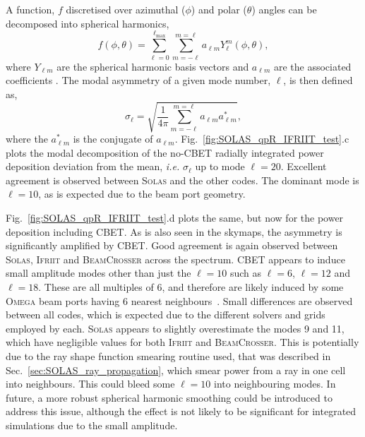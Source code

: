 A function, $f$ discretised over azimuthal ($\phi$) and polar ($\theta$) angles can be decomposed into spherical harmonics,
\begin{equation}
    f(\phi,\theta) = \sum_{\ell=0}^{\ell_{\text{max}}} \sum_{m=-\ell}^{m=\ell} a_{\ell m} Y_{\ell}^{m}(\phi,\theta),
\end{equation}
where $Y_{\ell m}$ are the spherical harmonic basis vectors and $a_{\ell m}$ are the associated coefficients \cite{colaitis_3d_2023}.
The modal asymmetry of a given mode number, $\ell$, is then defined as,
\begin{equation}
    \sigma_{\ell} = \sqrt{ \frac{1}{4\pi} \sum_{m=-\ell}^{m=\ell} a_{\ell m} a^*_{\ell m} },
\end{equation}
where the $a^*_{\ell m}$ is the conjugate of $a_{\ell m}$.
Fig.~\ref{fig:SOLAS_qpR_IFRIIT_test}.c plots the modal decomposition of the no-\ac{CBET} radially integrated power deposition deviation from the mean, \textit{i.e.} $\sigma_{\ell}$ up to mode $\ell=20$.
Excellent agreement is observed between \textsc{Solas} and the other codes.
The dominant mode is $\ell=10$, as is expected due to the beam port geometry.

Fig.~\ref{fig:SOLAS_qpR_IFRIIT_test}.d plots the same, but now for the power deposition including \ac{CBET}.
As is also seen in the skymaps, the asymmetry is significantly amplified by \ac{CBET}.
Good agreement is again observed between \textsc{Solas}, \textsc{Ifriit} and \textsc{BeamCrosser} across the spectrum.
\ac{CBET} appears to induce small amplitude modes other than just the $\ell=10$ such as $\ell=6$, $\ell=12$ and $\ell=18$.
These are all multiples of 6, and therefore are likely induced by some \textsc{Omega} beam ports having 6 nearest neighbours~\cite{boehly_upgrade_1995,simon_lle_1989}.
Small differences are observed between all codes, which is expected due to the different solvers and grids employed by each.
\textsc{Solas} appears to slightly overestimate the modes 9 and 11, which have negligible values for both \textsc{Ifriit} and \textsc{BeamCrosser}.
This is potentially due to the ray shape function smearing routine used, that was described in Sec.~\ref{sec:SOLAS_ray_propagation}, which smear power from a ray in one cell into neighbours.
This could bleed some $\ell=10$ into neighbouring modes.
In future, a more robust spherical harmonic smoothing could be introduced to address this issue, although the effect is not likely to be significant for integrated simulations due to the small amplitude.

